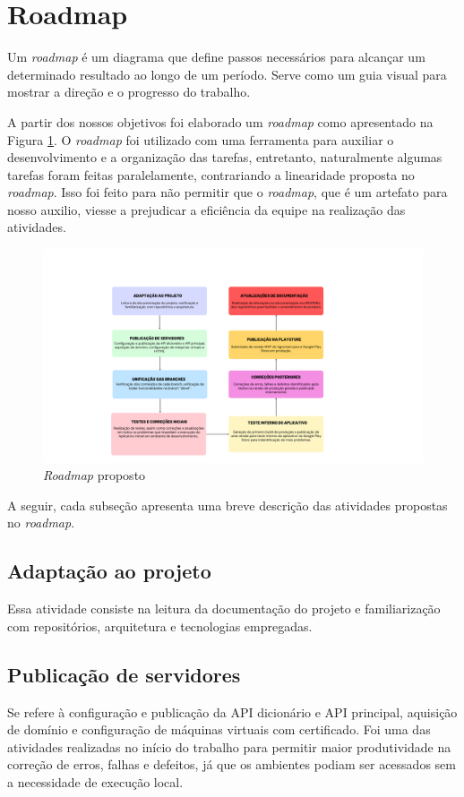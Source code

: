 \section{Roadmap}
Um \textit{roadmap} é um diagrama que define passos necessários para alcançar um determinado resultado ao longo de um período. Serve como um guia visual para mostrar a direção e o progresso do trabalho.

A partir dos nossos objetivos foi elaborado um \textit{roadmap} como apresentado na Figura \ref{roadmap}. O \textit{roadmap} foi utilizado com uma ferramenta para auxiliar o desenvolvimento e a organização das tarefas, entretanto, naturalmente algumas tarefas foram feitas paralelamente, contrariando a linearidade proposta no \textit{roadmap}. Isso foi feito para não permitir que o \textit{roadmap}, que é um artefato para nosso auxilio, viesse a prejudicar a eficiência da equipe na realização das atividades.

\begin{figure}[h]
	\centering
	\includegraphics[keepaspectratio=true,scale=0.3]{figuras/roadmap2.png}
	\caption{\textit{Roadmap} proposto}
	\label{roadmap}
\end{figure}

A seguir, cada subseção apresenta uma breve descrição das atividades propostas no \textit{roadmap}.

\subsection{Adaptação ao projeto}
Essa atividade consiste na leitura da documentação do projeto e familiarização com repositórios, arquitetura e tecnologias empregadas.

\subsection{Publicação de servidores}
Se refere à configuração e publicação da API dicionário e API principal, aquisição de domínio e configuração de máquinas virtuais com certificado. Foi uma das atividades realizadas no início do trabalho para permitir maior produtividade na correção de erros, falhas e defeitos, já que os ambientes podiam ser acessados sem a necessidade de execução local.

